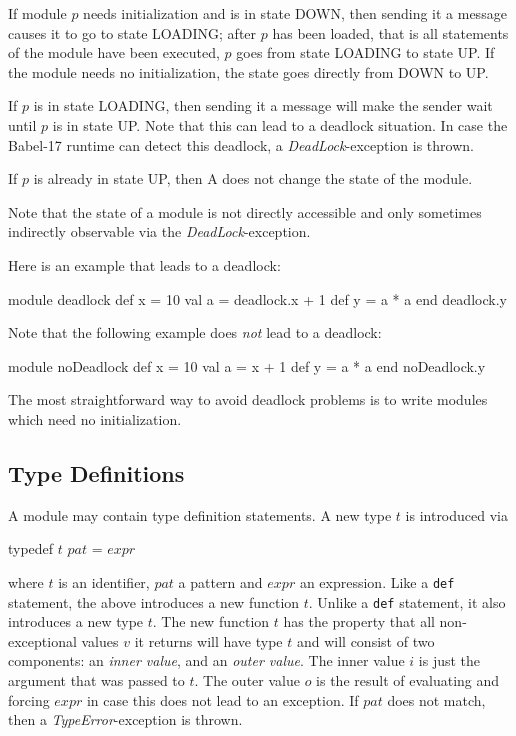 \documentclass[11pt]{amsart}
\newcommand{\babelsrc}[1] {\lstinline!#1!}
\begin{document}
If module $p$ needs initialization and is in state DOWN, then sending it a message causes it to go to state LOADING; after $p$ has been loaded, that is all statements of the module have been executed, $p$ goes from state LOADING to state UP. If the module needs no initialization, the state goes directly from DOWN to UP.

If $p$ is in state LOADING, then sending it a message will make the sender wait until $p$ is in state UP. Note that this can lead to a deadlock situation. In case the Babel-17 runtime can detect this deadlock, a \emph{DeadLock}-exception is thrown. 

If $p$ is already in state UP, then A does not change the state of the module. 

Note that the state of a module is not directly accessible and only sometimes indirectly observable via the \emph{DeadLock}-exception.

Here is an example that leads to a deadlock:
\begin{babellisting}
module deadlock
  def x = 10
  val a = deadlock.x + 1
  def y = a * a
end
deadlock.y
\end{babellisting}
Note that the following example does \emph{not} lead to a deadlock:
\begin{babellisting}
module noDeadlock
  def x  = 10
  val a = x + 1
  def y = a * a
end
noDeadlock.y
\end{babellisting}
The most straightforward way to avoid deadlock problems is to write modules which need no initialization. 

\subsection{Type Definitions}\label{sec:typedefs}
A module may contain type definition statements. A new type $t$ is introduced via
\begin{babellisting}
typedef $t$ $pat$ = $expr$
\end{babellisting}
where $t$ is an identifier, $pat$ a pattern and $expr$ an expression. Like a \babelsrc{def} statement, the above introduces a new function $t$. Unlike a \babelsrc{def} statement, it also introduces a new type $t$. The new function $t$ has the property that all non-exceptional values $v$ it returns will have type $t$ and will consist of two components: an \emph{inner value}, and an \emph{outer value}. The inner value $i$ is just the argument that was passed to $t$. The outer value $o$ is the result of evaluating and forcing $expr$ in case this does not lead to an exception. If $pat$ does not match, then a \emph{TypeError}-exception is thrown. 
\end{document}
